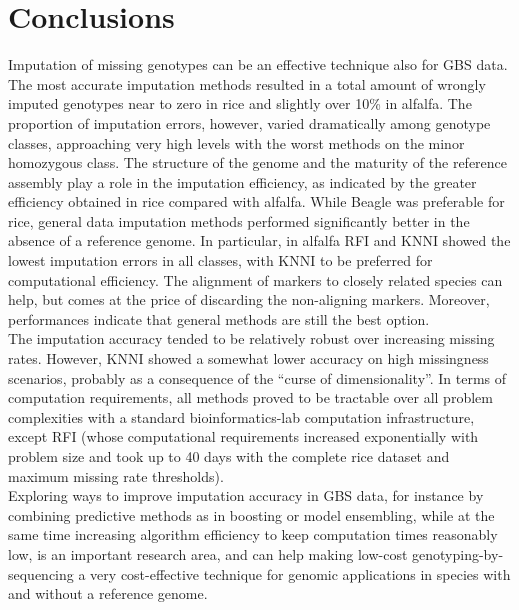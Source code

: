 \section{Conclusions}
\label{sec:conclusions}
Imputation of missing genotypes can be an effective technique also for GBS data.
The most accurate imputation methods resulted in a total amount of wrongly imputed genotypes near to zero in rice and slightly over 10\% in alfalfa. 
The proportion of imputation errors, however, varied dramatically among genotype classes, approaching very high levels with the worst methods on the minor homozygous class.
The structure of the genome and the maturity of the reference assembly play a role in the imputation efficiency, as indicated by the greater efficiency obtained in rice compared with alfalfa. While Beagle was preferable for rice, general data imputation methods performed significantly better in the absence of a reference genome. In particular, in alfalfa RFI and KNNI showed the lowest imputation errors in all classes, with KNNI to be preferred for computational efficiency. The alignment of markers to closely related species can help, but comes at the price of discarding the non-aligning markers. Moreover, performances indicate that general methods are still the best option.\\
The imputation accuracy tended to be relatively robust over increasing missing rates. However, KNNI showed a somewhat lower accuracy on high missingness scenarios, probably as a consequence of the ``curse of dimensionality''. In terms of computation requirements, all methods proved to be tractable over all problem complexities with a standard bioinformatics-lab computation infrastructure, except RFI (whose computational requirements increased exponentially with problem size and took up to 40 days with the complete rice dataset and maximum missing rate thresholds).\\
Exploring ways to improve imputation accuracy in GBS data, for instance by combining predictive methods as in boosting or model ensembling, while at the same time increasing algorithm efficiency to keep computation times reasonably low, is an important research area, and can help making low-cost genotyping-by-sequencing a very cost-effective technique for genomic applications in species with and without a reference genome.

